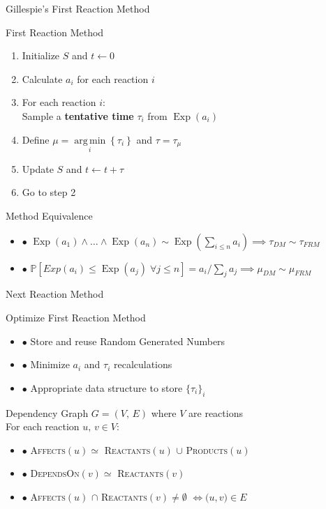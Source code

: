 \documentclass{beamer}
\DeclareMathOperator{\Exp}{\text{Exp}}
\DeclareMathOperator*{\argmin}{arg\,min}
\begin{document}
\begin{frame}{Gillespie's First Reaction Method}
  \begin{block}{First Reaction Method}
    \begin{enumerate}
    \item Initialize $S$ and $t\leftarrow 0$ 
    \item Calculate $a_i$ for each reaction $i$
    \item For each reaction $i$: \\
       Sample a \textbf{tentative time} $\tau_i$ from $\Exp\left(a_i\right)$  
    \item Define $\mu = \argmin\limits_i\left\{\tau_i\right\}$ and $\tau = \tau_\mu$
    \item Update $S$ and $t \leftarrow t + \tau$
    \item Go to step 2
    \end{enumerate}
  \end{block}
  \pause
  \begin{block}{Method Equivalence}
    \begin{itemize}
    \item $\bullet$ $\Exp(a_1) \land \dots \land \Exp(a_n) \sim
      \Exp\left(\sum_{i\leq n} a_i\right) \implies \tau_{DM}  \sim \tau_{FRM}$
    \item $\bullet$ $\mathbb{P}\left[Exp(a_i) \leq \Exp(a_j) \;
        \forall j \leq n \right] = a_i \big/\sum_ja_j \implies \mu_{DM} \sim \mu_{FRM}$
    \end{itemize}
  \end{block}
\end{frame}

\begin{frame}{Next Reaction Method}
  \begin{block}{Optimize First Reaction Method}
    \begin{itemize}
    \item $\bullet$ Store and reuse Random Generated Numbers
    \item $\bullet$ Minimize $a_i$ and $\tau_i$ recalculations
    \item $\bullet$ Appropriate data structure to store $\bigl\{\tau_i\bigr\}_i$
    \end{itemize}
  \end{block}
  \pause
  \begin{block}{Dependency Graph}
    $G=\left(V,\, E\right)$ where $V$ are reactions \\
    \vspace{2pt}
    For each reaction $u,\, v \in V$:
    \begin{itemize}
    \item $\bullet$ \textsc{Affects}$(u) \simeq $ \textsc{Reactants}$(u)$ $\cup$ \textsc{Products}$(u)$
    \item $\bullet$ \textsc{DependsOn}$(v) \simeq $ \textsc{Reactants}$(v)$
    \item $\bullet$ \textsc{Affects}$(u)$ $\cap$
      \textsc{Reactants}$(v) \neq \emptyset$ $\iff \bigl(u, v \bigr) \in E$   
    \end{itemize}    
  \end{block}
\end{frame}
\end{document}
